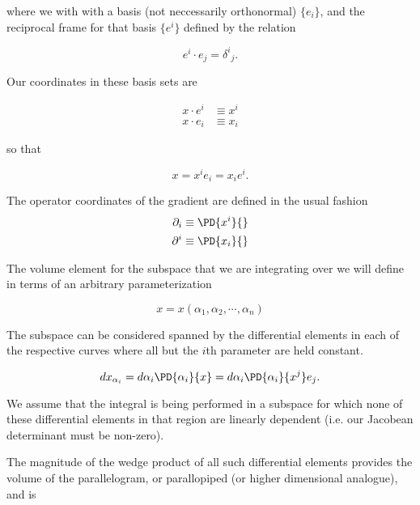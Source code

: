 where we with with a basis (not neccessarily orthonormal) $\{e_i\}$, and the reciprocal frame for that basis $\{e^i\}$ defined by the relation

\begin{equation}\label{eqn:stokesTensor:n}
e^i \cdot e_j = {\delta^i}_j.
\end{equation}

Our coordinates in these basis sets are

\begin{align}\label{eqn:stokesTensor:n}
x \cdot e^i &\equiv x^i \\
x \cdot e_i &\equiv x_i
\end{align}

so that

\begin{equation}\label{eqn:stokesTensor:n}
x = x^i e_i = x_i e^i.
\end{equation}

The operator coordinates of the gradient are defined in the usual fashion
\begin{align}\label{eqn:stokesTensor:n}
\partial_i &\equiv \PD{x^i}{} \\
\partial^i &\equiv \PD{x_i}{}
\end{align}

The volume element for the subspace that we are integrating over we will define in terms of an arbitrary parameterization

\begin{equation}\label{eqn:stokesTensor:n}
x = x(\alpha_1, \alpha_2, \cdots, \alpha_n)
\end{equation}

The subspace can be considered spanned by the differential elements in each of the respective curves where all but the $i$th parameter are held constant.

\begin{equation}\label{eqn:stokesTensor:n}
dx_{\alpha_i}
= d\alpha_i \PD{\alpha_i}{x}
= d\alpha_i \PD{\alpha_i}{x^j} e_j.
\end{equation}

We assume that the integral is being performed in a subspace for which none of these differential elements in that region are linearly dependent (i.e. our Jacobean determinant must be non-zero).

The magnitude of the wedge product of all such differential elements provides the volume of the parallelogram, or parallopiped (or higher dimensional analogue), and is

